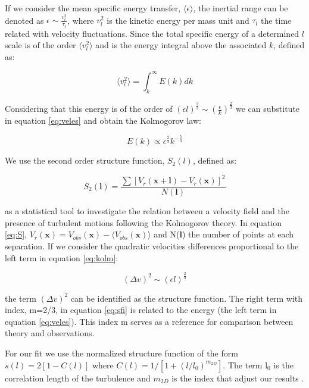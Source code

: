 \documentclass[fleqn,usenatbib]{mnras}
\begin{document}
If we consider the mean specific energy transfer, $\langle \epsilon \rangle$, the inertial range can be denoted as $\epsilon \sim \frac{v_{l}^{2}}{\tau_{l}}$, where $v_{l}^{2}$ is the kinetic energy per mass unit and $\tau_{l}$ the time related with velocity fluctuations. Since the total specific energy of a determined $l$ scale is of the order $\langle v_{l}^{2} \rangle$ and is the energy integral above the associated $k$, defined as:

\begin{equation}\label{eq:veles}
 \langle v_{l}^{2} \rangle = \int_{k}^{\infty} E(k)dk
\end{equation}

Considering that this energy is of the order of $(\epsilon l)^{\frac{2}{3}} \sim (\frac{\epsilon}{k})^{\frac{2}{3}}$ we can substitute in equation \ref{eq:veles} and obtain the Kolmogorov law:

\begin{equation}\label{eq:kolm}
E(k) \propto \epsilon^\frac{2}{3} k^{-\frac{5}{3}}
\end{equation}

We use the second order structure function, $S_{2}(l)$, defined as:

\begin{equation}\label{eq:S}
S_{2}(\boldsymbol{l})=\dfrac{\sum[V_{r}(\boldsymbol{x}+\boldsymbol{l})-V_{r}(\boldsymbol{x}) ]^{2}}{N(\boldsymbol{l})}
\end{equation}

as a statistical tool to investigate the relation between a velocity field and the presence of turbulent motions following the Kolmogorov theory. In equation \ref{eq:S}, $V_{r}(\boldsymbol{x})= V_{obs}(\boldsymbol{x})-\langle V_{obs}(\boldsymbol{x}) \rangle$ and N($\boldsymbol{l}$) the number of points at each separation. If we consider the quadratic velocities differences proportional to the left term in equation \ref{eq:kolm}:

\begin{equation}\label{eq:sfi}
(\Delta v)^{2} \sim (\epsilon l)^{\frac{2}{3}}
\end{equation}

the term $(\Delta v)^{2}$ can be identified as the structure function. The right term with index,  m=2/3, in equation \ref{eq:sfi} is related to the energy (the left term in equation \ref{eq:veles}). This index m serves as a reference for comparison between theory and observations.

For our fit we use the normalized structure function of the form $s(l)=2[1-C(l)]$ where $C(l)=1/[1+(l/l_{0})^{m_{2D}}]$. The term l$_{0}$ is the correlation length of the turbulence and $m_{2D}$ is the index that adjust our results \citep{1984ApJ...277..556S, arthur2016turbulence}.
\end{document}
